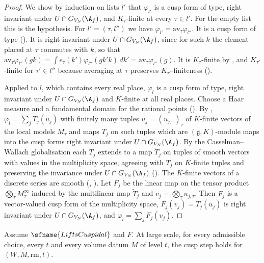 \begin{proof}
We show by induction on lists $l'$ that $\varphi_{l'}$ is a cusp form of type, right invariant under $U\cap G_{V_N}(\A_f)$,
and $K_\tau$-finite at every $\tau\in l'$. For the empty list this is the hypothesis. For $l'=(\tau,l'')$ we have
$\varphi_{l'}=\mathrm{av}_\tau\varphi_{l''}$. It is a cusp form of type ().
It is right invariant under $U\cap G_{V_N}(\A_f)$, since for such $k$ the element placed at $\tau$ commutes with $k$, so that
$\mathrm{av}_\tau\varphi_{l''}(gk)=\int e_\tau(k')\varphi_{l''}(gk'k)\,dk'=\mathrm{av}_\tau\varphi_{l''}(g)$. It is
$K_\tau$-finite by , and $K_{\tau'}$-finite for
$\tau'\in l''$ because averaging at $\tau$ preserves $K_{\tau'}$-finiteness
().

Applied to $l$, which contains every real place, $\varphi_l$ is a cusp form of type, right invariant under
$U\cap G_{V_N}(\A_f)$ and $K$-finite at all real places. Choose a Haar measure and a fundamental domain for the rational
points (). By
, $\varphi_l=\sum_jT_j(u_j)$ with finitely many tuples
$u_j=(u_{j,\tau})_\tau$ of $K$-finite vectors of the local models $M_\tau$ and maps $T_j$ on such tuples which are
$(\mathfrak g,K)$-module maps into the cusp forms right invariant under $U\cap G_{V_N}(\A_f)$. By the Casselman--Wallach
globalisation each $T_j$ extends to a map $\tilde T_j$ on tuples of smooth vectors with values in the multiplicity space,
agreeing with $T_j$ on $K$-finite tuples and preserving the invariance under $U\cap G_{V_N}(\A_f)$
(). The $K$-finite vectors of a discrete series are smooth
(, ). Let $F_j$
be the linear map on the tensor product $\bigotimes_\tau M_\tau^\infty$ induced by the multilinear map $\tilde T_j$ and
$v_j=\bigotimes_\tau u_{j,\tau}$. Then $F_j$ is a vector-valued cusp form of the multiplicity space, $F_j(v_j)=T_j(u_j)$ is right
invariant under $U\cap G_{V_N}(\A_f)$, and $\varphi_l=\sum_jF_j(v_j)$.
\end{proof}

\begin{lemma}\label{pf:rowprops:cuspstep}
Assume $\sfname{LiftsCuspidal}$ and $F$. At large scale, for every admissible choice, every $t$ and every volume datum $M$
of level $t$, the cusp step holds for $(W,M,\mathrm{rm},t)$.
\end{lemma}

